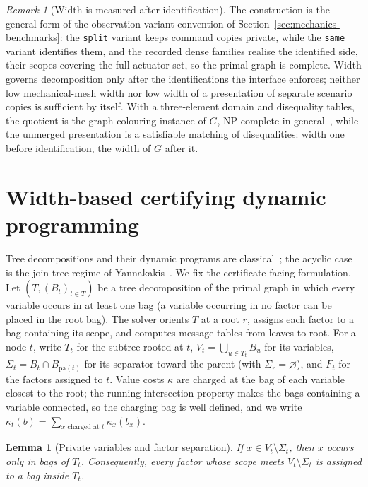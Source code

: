 \documentclass[11pt]{article}
\theoremstyle{plain}
\newtheorem{lemma}[theorem]{Lemma}
\theoremstyle{definition}
\theoremstyle{remark}
\newtheorem{remark}[theorem]{Remark}
\begin{document}
\begin{remark}[Width is measured after identification]
\label{rem:identification-width}
The construction is the general form of the observation-variant convention of
Section~\ref{sec:mechanics-benchmarks}: the \texttt{split} variant keeps
command copies private, while the \texttt{same} variant identifies them, and
the recorded dense families realise the identified side, their scopes
covering the full actuator set, so the primal graph is complete.  Width
governs decomposition only after the identifications the interface enforces;
neither low mechanical-mesh width nor low width of a presentation of separate
scenario copies is sufficient by itself.  With a three-element domain and
disequality tables, the quotient is the graph-colouring instance of \(G\),
NP-complete in general~\cite{gareyjohnson79}, while the unmerged presentation
is a satisfiable matching of disequalities: width one before identification,
the width of \(G\) after it.
\end{remark}

\section{Width-based certifying dynamic programming}
\label{sec:width-dp}

Tree decompositions and their dynamic programs are
classical~\cite{robertson-seymour84,bodlaender93,bodlaender-koster08,arnborg-proskurowski89,dechter03};
the acyclic case is the join-tree regime of Yannakakis~\cite{yannakakis81}.
We fix the certificate-facing formulation.  Let \((T,(B_t)_{t\in T})\) be a
tree decomposition of the primal graph in which every variable occurs in at
least one bag (a variable occurring in no factor can be placed in the root
bag).  The solver orients \(T\) at a root \(r\), assigns each factor to a bag
containing its scope, and computes message tables from leaves to root.  For a
node \(t\), write \(T_t\) for the subtree rooted at \(t\),
\(V_t=\bigcup_{u\in T_t}B_u\) for its variables,
\(\Sigma_t=B_t\cap B_{\mathrm{pa}(t)}\) for its separator toward the parent
(with \(\Sigma_r=\varnothing\)), and \(F_t\) for the factors assigned to
\(t\).  Value costs \(\kappa\) are charged at the bag of each variable
closest to the root; the running-intersection property makes the bags
containing a variable connected, so the charging bag is well defined, and we
write \(\kappa_t(b)=\sum_{x\text{ charged at }t}\kappa_x(b_x)\).

\begin{lemma}[Private variables and factor separation]
\label{lem:private-variables}
If \(x\in V_t\setminus\Sigma_t\), then \(x\) occurs only in bags of \(T_t\).
Consequently, every factor whose scope meets \(V_t\setminus\Sigma_t\) is
assigned to a bag inside \(T_t\).
\end{lemma}
\end{document}
